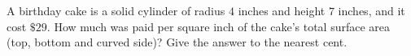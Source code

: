 A birthday cake is a solid cylinder of radius $4$ inches and height $7$ inches, and it cost $\$29$. How much was paid per square inch of the cake's total surface area (top, bottom and curved side)? Give the answer to the nearest cent.
